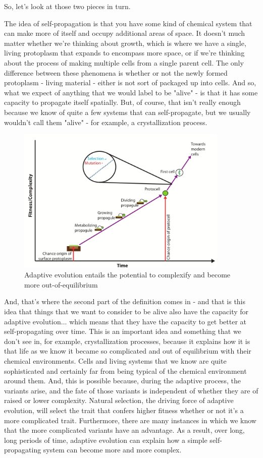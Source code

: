 \documentclass[]{article}
\begin{document}
So, let's look at those two pieces in turn.


The idea of self-propagation is that you have some kind of chemical system that can make more of itself and occupy additional areas of space. It doesn't much matter
whether we're thinking about growth, which is where we have a single,
living protoplasm that expands to encompass more space, 
or if we're thinking about
the process of making multiple cells
from a single parent cell.
The only difference
between these phenomena
is whether or not the newly formed
protoplasm - living material -
either is not sort of
packaged up into cells.
And so, what we expect of anything
that we would label to be "alive" -
is that it has some capacity
to propagate itself spatially.
But, of course,
that isn't really enough
because we know of quite a few
systems that can self-propagate,
but we usually
wouldn't call them "alive" -
for example, a crystallization process.
\begin{figure}[H]
	\caption[Adaptive Evolution]{Adaptive evolution entails the potential to complexify and become more out-of-equilibrium}\label{fig:AdaptiveEvolution} 
	\includegraphics[width=0.9\textwidth]{AdaptiveEvolution}
\end{figure}

And, that's where the second part
of the definition comes in -
and that is this idea that things
that we want to consider to be alive
also have the capacity
for adaptive evolution...
which means that
they have the capacity
to get better at
self-propagating over time.
This is an important idea
and something that we don't see in,
for example, crystallization processes,
because it explains
how it is that life as we know it
became so complicated
and out of equilibrium
with their chemical environments.
Cells and living systems that we know
are quite sophisticated
and certainly far from being typical of
the chemical environment around them.
And, this is possible because,
during the adaptive process,
the variants arise,
and the fate of those variants
is independent of whether they are
of raised or lower complexity.
Natural selection,
the driving force of adaptive evolution,
will select the trait that
confers higher fitness
whether or not
it's a more complicated trait.
Furthermore, there are many instances
in which we know
that the more complicated variants
have an advantage.
As a result,
over long, long periods of time,
adaptive evolution can explain
how a simple self-propagating system
can become more and more complex.
\end{document}
